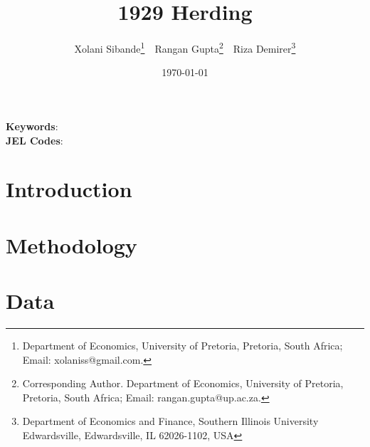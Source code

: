 \documentclass[
  12,
]{article}
\author{}
\date{\vspace{-2.5em}}
\begin{document}
\title{1929 Herding}


\author { Xolani Sibande\footnote{Department of Economics, University of Pretoria, Pretoria, South Africa; Email: xolaniss@gmail.com.} \,\, 
Rangan Gupta\footnote{Corresponding Author. Department of Economics, University of Pretoria, Pretoria, South Africa; Email: rangan.gupta@up.ac.za.} \,\,
Riza Demirer\footnote{Department of Economics and Finance, Southern Illinois University Edwardsville, Edwardsville, IL 62026-1102, USA}}
\date{\today}
\maketitle

\begin{abstract}


\end{abstract}

\noindent\textbf{Keywords}:   \\
\textbf{JEL Codes}: 
\newpage

\hypertarget{introduction}{%
\section{Introduction}\label{introduction}}

\hypertarget{methodology}{%
\section{Methodology}\label{methodology}}

\citet{sim2015oil}

\hypertarget{data}{%
\section{Data}\label{data}}

\providecommand{\docline}[3]{\noalign{\global\setlength{\arrayrulewidth}{#1}}\arrayrulecolor[HTML]{#2}\cline{#3}}

\setlength{\tabcolsep}{0pt}

\renewcommand*{\arraystretch}{1.5}
\end{document}
